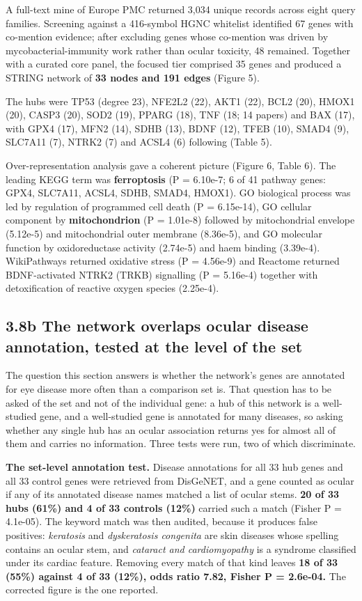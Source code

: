 \documentclass[utf8]{FrontiersinVancouver}
\begin{document}
A full-text mine of Europe PMC returned 3,034 unique records across eight query families. Screening against a 416-symbol HGNC whitelist identified 67 genes with co-mention evidence; after excluding genes whose co-mention was driven by mycobacterial-immunity work rather than ocular toxicity, 48 remained. Together with a curated core panel, the focused tier comprised 35 genes and produced a STRING network of \textbf{33 nodes and 191 edges} (Figure 5).

The hubs were TP53 (degree 23), NFE2L2 (22), AKT1 (22), BCL2 (20), HMOX1 (20), CASP3 (20), SOD2 (19), PPARG (18), TNF (18; 14 papers) and BAX (17), with GPX4 (17), MFN2 (14), SDHB (13), BDNF (12), TFEB (10), SMAD4 (9), SLC7A11 (7), NTRK2 (7) and ACSL4 (6) following (Table 5).

Over-representation analysis gave a coherent picture (Figure 6, Table 6). The leading KEGG term was \textbf{ferroptosis} (P = 6.10e-7; 6 of 41 pathway genes: GPX4, SLC7A11, ACSL4, SDHB, SMAD4, HMOX1). GO biological process was led by regulation of programmed cell death (P = 6.15e-14), GO cellular component by \textbf{mitochondrion} (P = 1.01e-8) followed by mitochondrial envelope (5.12e-5) and mitochondrial outer membrane (8.36e-5), and GO molecular function by oxidoreductase activity (2.74e-5) and haem binding (3.39e-4). WikiPathways returned oxidative stress (P = 4.56e-9) and Reactome returned BDNF-activated NTRK2 (TRKB) signalling (P = 5.16e-4) together with detoxification of reactive oxygen species (2.25e-4).

\subsection{3.8b The network overlaps ocular disease annotation, tested at the level of the set}

The question this section answers is whether the network's genes are annotated for eye disease more often than a comparison set is. That question has to be asked of the set and not of the individual gene: a hub of this network is a well-studied gene, and a well-studied gene is annotated for many diseases, so asking whether any single hub has an ocular association returns yes for almost all of them and carries no information. Three tests were run, two of which discriminate.

\textbf{The set-level annotation test.} Disease annotations for all 33 hub genes and all 33 control genes were retrieved from DisGeNET, and a gene counted as ocular if any of its annotated disease names matched a list of ocular stems. \textbf{20 of 33 hubs (61\%) and 4 of 33 controls (12\%)} carried such a match (Fisher P = 4.1e-05). The keyword match was then audited, because it produces false positives: \textit{keratosis} and \textit{dyskeratosis congenita} are skin diseases whose spelling contains an ocular stem, and \textit{cataract and cardiomyopathy} is a syndrome classified under its cardiac feature. Removing every match of that kind leaves \textbf{18 of 33 (55\%) against 4 of 33 (12\%), odds ratio 7.82, Fisher P = 2.6e-04.} The corrected figure is the one reported.
\end{document}

